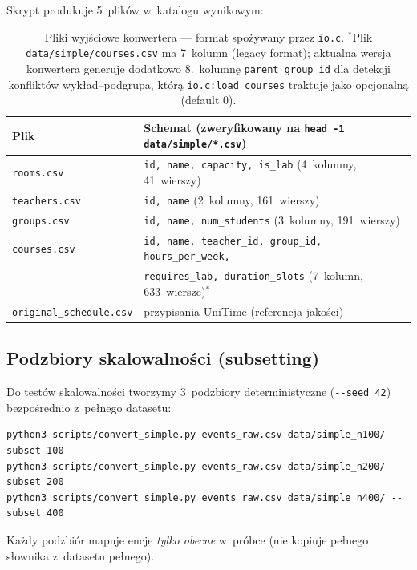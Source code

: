 \documentclass{common/sprawozdanie-agh}
\begin{document}
Skrypt produkuje 5~plików w~katalogu wynikowym:

\begin{table}[H]
\centering\small
\begin{tabularx}{\textwidth}{lX}
\toprule
\textbf{Plik} & \textbf{Schemat (zweryfikowany na \texttt{head -1 data/simple/*.csv})} \\
\midrule
\texttt{rooms.csv}             & \texttt{id, name, capacity, is\_lab} (4~kolumny, 41~wierszy) \\
\texttt{teachers.csv}          & \texttt{id, name} (2~kolumny, 161~wierszy) \\
\texttt{groups.csv}            & \texttt{id, name, num\_students} (3~kolumny, 191~wierszy) \\
\texttt{courses.csv}           & \texttt{id, name, teacher\_id, group\_id, hours\_per\_week,} \\
                               & \texttt{requires\_lab, duration\_slots} (7~kolumn, 633~wiersze)$^*$ \\
\texttt{original\_schedule.csv} & przypisania UniTime (referencja jakości) \\
\bottomrule
\end{tabularx}
\caption{Pliki wyjściowe konwertera --- format spożywany przez \texttt{io.c}. $^*$Plik \texttt{data/simple/courses.csv} ma 7~kolumn (legacy format); aktualna wersja konwertera generuje dodatkowo 8.~kolumnę \texttt{parent\_group\_id} dla detekcji konfliktów wykład--podgrupa, którą \texttt{io.c:load\_courses} traktuje jako opcjonalną (default 0).}
\end{table}

\subsection{Podzbiory skalowalności (subsetting)}

Do testów skalowalności tworzymy 3~podzbiory deterministyczne (\texttt{-{}-seed 42}) bezpośrednio z~pełnego datasetu:

\begin{lstlisting}[style=bashstyle]
python3 scripts/convert_simple.py events_raw.csv data/simple_n100/ --subset 100
python3 scripts/convert_simple.py events_raw.csv data/simple_n200/ --subset 200
python3 scripts/convert_simple.py events_raw.csv data/simple_n400/ --subset 400
\end{lstlisting}

Każdy podzbiór mapuje encje \emph{tylko obecne} w~próbce (nie kopiuje pełnego słownika z~datasetu pełnego).
\end{document}
